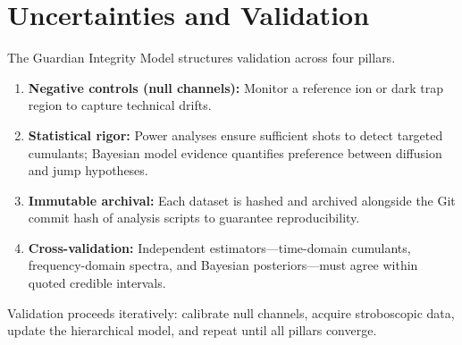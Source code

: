 \section{Uncertainties and Validation}
The Guardian Integrity Model structures validation across four pillars.
\begin{enumerate}
  \item \textbf{Negative controls (null channels):} Monitor a reference ion or dark trap region to capture technical drifts.
  \item \textbf{Statistical rigor:} Power analyses ensure sufficient shots to detect targeted cumulants; Bayesian model evidence quantifies preference between diffusion and jump hypotheses.
  \item \textbf{Immutable archival:} Each dataset is hashed and archived alongside the Git commit hash of analysis scripts to guarantee reproducibility.
  \item \textbf{Cross-validation:} Independent estimators—time-domain cumulants, frequency-domain spectra, and Bayesian posteriors—must agree within quoted credible intervals.
\end{enumerate}

Validation proceeds iteratively: calibrate null channels, acquire stroboscopic data, update the hierarchical model, and repeat until all pillars converge.
